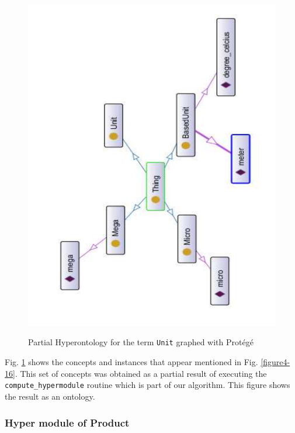 \begin{figure}
\begin{center}
	\includegraphics[scale=0.5, angle =270]{figure-chapterIV/fig4-17.pdf}\\
	\caption{Partial Hyperontology for the term \texttt{Unit} graphed with Protégé}
	\label{figure4-17}
\end{center}
\end{figure}


Fig. \ref{figure4-17} shows the concepts and instances that appear mentioned in Fig. \ref{figure4-16}. This set of concepts was obtained as a partial result of executing the \texttt{compute\_hypermodule} routine which is part of our algorithm. This figure shows the result as an ontology. 

\subsubsection{Hyper module of Product}\label{subsubsection4.2.5.2}

